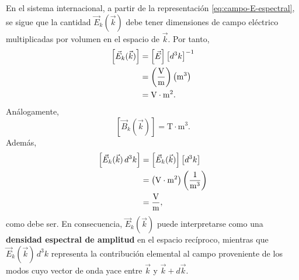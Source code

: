\documentclass[12pt,a4paper]{article}
\theoremstyle{definition}
\theoremstyle{plain}
\numberwithin{equation}{section}
\theoremstyle{remark}
\begin{document}
En el sistema internacional, a partir de la representación \eqref{eq:campo-E-espectral}, se sigue que la cantidad $\vec E_k(\vec k)$ debe tener dimensiones de campo eléctrico multiplicadas por volumen en el espacio de $\vec k$. Por tanto,
\begin{align*}
    \left[\vec E_k(\vec k)\right]
    &=\left[\vec E\right]\left[d^3k\right]^{-1} \notag\\
    &=\left(\frac{\mathrm{V}}{\mathrm{m}}\right)\left(\mathrm{m}^3\right) \notag\\
    &=\mathrm{V}\cdot \mathrm{m}^2.
\end{align*}
Análogamente,
\begin{equation*}
    \left[\vec B_k(\vec k)\right]=\mathrm{T}\cdot \mathrm{m}^3.
\end{equation*}
Además,
\begin{align*}
    \left[\vec E_k(\vec k)\,d^3k\right]
    &=\left[\vec E_k(\vec k)\right]\left[d^3k\right] \notag\\
    &=\left(\mathrm{V}\cdot \mathrm{m}^2\right)\left(\frac{1}{\mathrm{m}^3}\right) \notag\\
    &=\frac{\mathrm{V}}{\mathrm{m}},
\end{align*}
como debe ser. En consecuencia, $\vec E_k(\vec k)$ puede interpretarse como una \textbf{densidad espectral de amplitud} en el espacio recíproco, mientras que $\vec E_k(\vec k)\,d^3k$ representa la contribución elemental al campo proveniente de los modos cuyo vector de onda yace entre $\vec k$ y $\vec k+d\vec k$.
\end{document}
